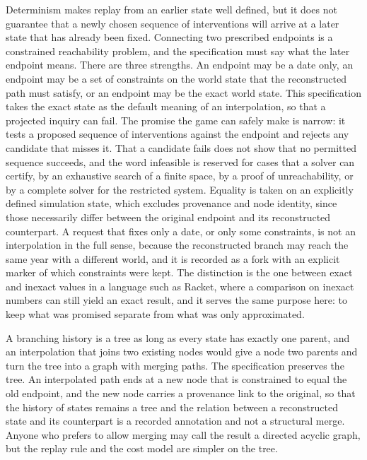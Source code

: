 \documentclass[11pt]{article}
\begin{document}
Determinism makes replay from an earlier state well defined, but it does not guarantee that a newly chosen sequence of interventions will arrive at a later state that has already been fixed. Connecting two prescribed endpoints is a constrained reachability problem, and the specification must say what the later endpoint means. There are three strengths. An endpoint may be a date only, an endpoint may be a set of constraints on the world state that the reconstructed path must satisfy, or an endpoint may be the exact world state. This specification takes the exact state as the default meaning of an interpolation, so that a projected inquiry can fail. The promise the game can safely make is narrow: it tests a proposed sequence of interventions against the endpoint and rejects any candidate that misses it. That a candidate fails does not show that no permitted sequence succeeds, and the word infeasible is reserved for cases that a solver can certify, by an exhaustive search of a finite space, by a proof of unreachability, or by a complete solver for the restricted system. Equality is taken on an explicitly defined simulation state, which excludes provenance and node identity, since those necessarily differ between the original endpoint and its reconstructed counterpart. A request that fixes only a date, or only some constraints, is not an interpolation in the full sense, because the reconstructed branch may reach the same year with a different world, and it is recorded as a fork with an explicit marker of which constraints were kept. The distinction is the one between exact and inexact values in a language such as Racket, where a comparison on inexact numbers can still yield an exact result, and it serves the same purpose here: to keep what was promised separate from what was only approximated.

A branching history is a tree as long as every state has exactly one parent, and an interpolation that joins two existing nodes would give a node two parents and turn the tree into a graph with merging paths. The specification preserves the tree. An interpolated path ends at a new node that is constrained to equal the old endpoint, and the new node carries a provenance link to the original, so that the history of states remains a tree and the relation between a reconstructed state and its counterpart is a recorded annotation and not a structural merge. Anyone who prefers to allow merging may call the result a directed acyclic graph, but the replay rule and the cost model are simpler on the tree.
\end{document}
